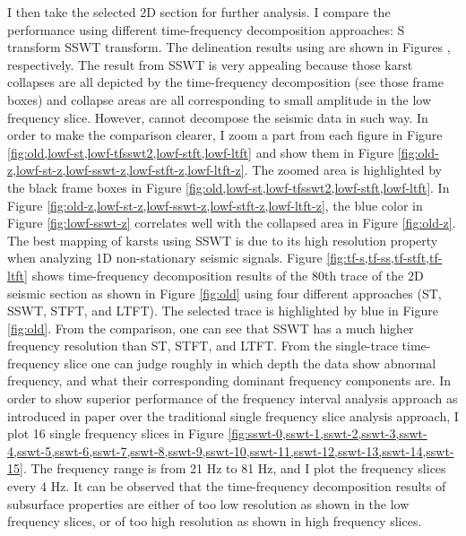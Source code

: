 I then take the selected 2D section for further analysis. I compare the performance using  different time-frequency decomposition approaches:  S transform SSWT transform.  The delineation results using  are shown in Figures , respectively. The result from SSWT is very appealing because those karst collapses are all depicted by the time-frequency decomposition (see those  frame boxes)\new{,} and  collapse areas are all corresponding to small amplitude in the low frequency slice. However,  cannot decompose the seismic data in such way.  In order to make the comparison clearer, I zoom a part from each figure in Figure \ref{fig:old,lowf-st,lowf-tfsswt2,lowf-stft,lowf-ltft} and show them in Figure \ref{fig:old-z,lowf-st-z,lowf-sswt-z,lowf-stft-z,lowf-ltft-z}. The zoomed area is highlighted by the black frame boxes in Figure \ref{fig:old,lowf-st,lowf-tfsswt2,lowf-stft,lowf-ltft}. In Figure \ref{fig:old-z,lowf-st-z,lowf-sswt-z,lowf-stft-z,lowf-ltft-z}, the blue color in Figure \ref{fig:lowf-sswt-z} correlates well with the collapsed area in Figure \ref{fig:old-z}. The best mapping of karsts using SSWT is due to its high resolution property when analyzing 1D non-stationary seismic signals. Figure \ref{fig:tf-s,tf-ss,tf-stft,tf-ltft} shows time-frequency decomposition results of the 80th trace of the 2D seismic section as shown in Figure \ref{fig:old}\new{,} using four different approaches (ST, SSWT, STFT, and LTFT). The selected trace is highlighted by blue in Figure \ref{fig:old}.  From the comparison, one can see that SSWT has a much higher frequency resolution than ST, STFT, and LTFT. From the single-trace time-frequency slice one can judge roughly in which depth the data show abnormal frequency, and what their corresponding dominant frequency components are. In order to show superior performance of the frequency interval analysis approach as introduced in  paper\new{,} over the traditional single frequency slice analysis approach, I plot 16 single frequency slices in Figure \ref{fig:sswt-0,sswt-1,sswt-2,sswt-3,sswt-4,sswt-5,sswt-6,sswt-7,sswt-8,sswt-9,sswt-10,sswt-11,sswt-12,sswt-13,sswt-14,sswt-15}. The frequency range is from 21 Hz to 81 Hz, and I plot the frequency slices every 4 Hz. It can be observed that the time-frequency decomposition results of subsurface properties are either of too low resolution\new{,} as shown in the low frequency slices, or of too high resolution as shown in high frequency slices.  


